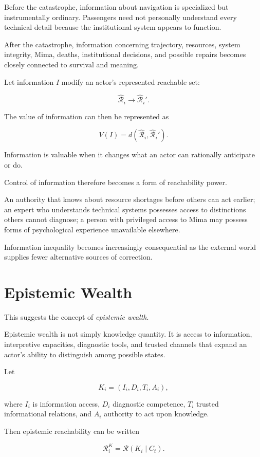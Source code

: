\documentclass[11pt,oneside]{book}
\theoremstyle{definition}
\theoremstyle{remark}
\newcommand{\R}{\mathcal{R}}
\begin{document}
Before the catastrophe, information about navigation is specialized but instrumentally ordinary. Passengers need not personally understand every technical detail because the institutional system appears to function.

After the catastrophe, information concerning trajectory, resources, system integrity, Mima, deaths, institutional decisions, and possible repairs becomes closely connected to survival and meaning.

Let information \(I\) modify an actor's represented reachable set:

\[
\widehat{\R}_i
\rightarrow
\widehat{\R}_i'.
\]

The value of information can then be represented as

\[
V(I)
=
d(
\widehat{\R}_i,
\widehat{\R}_i'
).
\]

Information is valuable when it changes what an actor can rationally anticipate or do.

Control of information therefore becomes a form of reachability power.

An authority that knows about resource shortages before others can act earlier; an expert who understands technical systems possesses access to distinctions others cannot diagnose; a person with privileged access to Mima may possess forms of psychological experience unavailable elsewhere.

Information inequality becomes increasingly consequential as the external world supplies fewer alternative sources of correction.

\section{Epistemic Wealth}

This suggests the concept of \emph{epistemic wealth}.

Epistemic wealth is not simply knowledge quantity. It is access to information, interpretive capacities, diagnostic tools, and trusted channels that expand an actor's ability to distinguish among possible states.

Let

\[
K_i
=
(I_i,D_i,T_i,A_i),
\]

where \(I_i\) is information access, \(D_i\) diagnostic competence, \(T_i\) trusted informational relations, and \(A_i\) authority to act upon knowledge.

Then epistemic reachability can be written

\[
\R_i^{K}
=
\R(K_i\mid C_t).
\]
\end{document}
